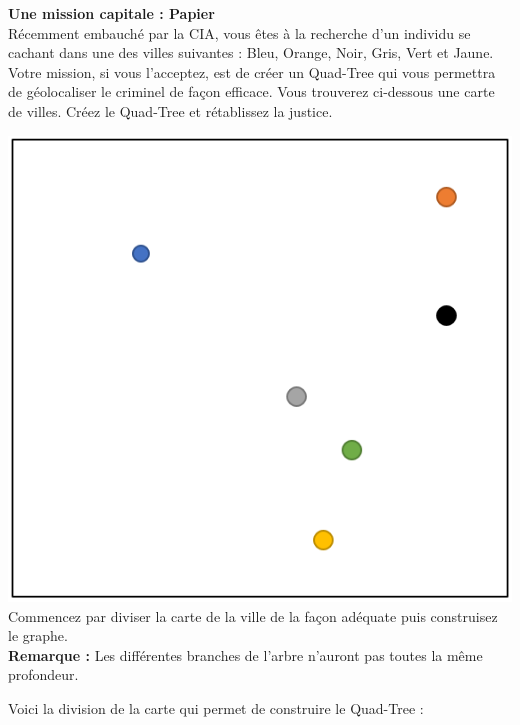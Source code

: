 \begin{Exercice}[10 minutes]\textbf{Une mission capitale : Papier}\\

Récemment embauché par la CIA, vous êtes à la recherche d'un individu se cachant dans une des villes suivantes : Bleu, Orange, Noir, Gris, Vert et Jaune. Votre mission, si vous l'acceptez, est de créer un Quad-Tree qui vous permettra de géolocaliser le criminel de façon efficace. Vous trouverez ci-dessous une carte de villes. Créez le Quad-Tree et rétablissez la justice.\\


\begin{conseil}
    \includegraphics[scale=0.9]{Quad-Tree3.PNG}
    \\Commencez par diviser la carte de la ville de la façon adéquate puis construisez le graphe.\\
    
    \textbf{Remarque : }Les différentes branches de l'arbre n'auront pas toutes la même profondeur.
\end{conseil}
\begin{solution}
    Voici la division de la carte qui permet de construire le Quad-Tree :\\
    

\end{solution}
\end{Exercice}
